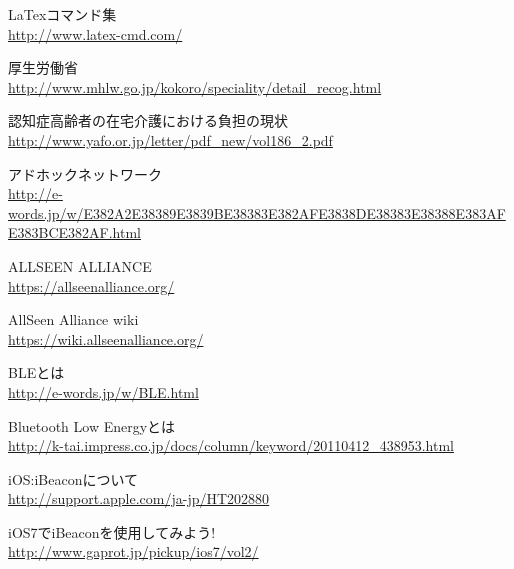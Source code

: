 \def\line{−\hspace*{-.7zw}−}

\begin{thebibliography}{99}

 LaTexコマンド集 \\ 
\url{http://www.latex-cmd.com/}

厚生労働省\\
\url{http://www.mhlw.go.jp/kokoro/speciality/detail_recog.html}

認知症高齢者の在宅介護における負担の現状\\
\url{http://www.yafo.or.jp/letter/pdf_new/vol186_2.pdf}

 アドホックネットワーク \\
\url{http://e-words.jp/w/E382A2E38389E3839BE38383E382AFE3838DE38383E38388E383AFE383BCE382AF.html}

ALLSEEN ALLIANCE \\
\url{https://allseenalliance.org/}

AllSeen Alliance wiki \\
\url{https://wiki.allseenalliance.org/}

BLEとは\\
\url{http://e-words.jp/w/BLE.html}

Bluetooth Low Energyとは\\
\url{http://k-tai.impress.co.jp/docs/column/keyword/20110412_438953.html}

iOS:iBeaconについて \\ 
\url{http://support.apple.com/ja-jp/HT202880}

iOS7でiBeaconを使用してみよう! \\ 
\url{http://www.gaprot.jp/pickup/ios7/vol2/}



\end{thebibliography}
